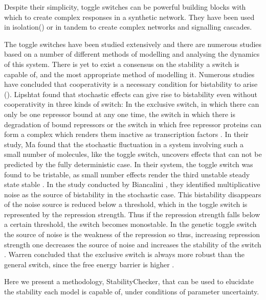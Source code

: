 Despite their simplicity, toggle switches can be powerful building blocks with which to create complex responses in a synthetic network. They have been used in isolation() or in tandem to create complex networks and signalling cascades. 

The toggle switches have been studied extensively and there are numerous studies based on a number of different methods of modelling and analysing the dynamics of this system. There is yet to exist a consensus on the stability a switch is capable of, and the most appropriate method of modelling it. Numerous studies have concluded that cooperativity is a necessary condition for bistability to arise (). Lipshtat \autocite{Lipshtat:2006wb} found that stochastic effects can give rise to bistability even without cooperativity in three kinds of switch: In the exclusive switch, in which there can only be one repressor bound at any one time, the switch in which there is degradation of bound repressors or the switch in which free repressor proteins can form a complex which renders them inactive as transcription factors \autocite{Lipshtat:2006wb}. In their study, Ma found that the stochastic fluctuation in a system involving such a small number of molecules, like the toggle switch, uncovers effects that can not be predicted by the fully deterministic case. In their system, the toggle switch was found to be tristable, as small number effects render the third unstable steady state stable \autocite{Ma:2012dt}. In the study conducted by Biancalini \autocite{Biancalani:2015vy}, they identified multiplicative noise as the source of bistability in the stochastic case. This bistability disappears of the noise source is reduced below a threshold, which in the toggle switch is represented by the repression strength. Thus if the repression strength falls below a certain threshold, the switch becomes monostable. In the genetic toggle switch the source of noise is the weakness of the repression so thus, increasing repression strength one decreases the source of noise and increases the stability of the switch \autocite{Warren:2005kea}. Warren concluded that the exclusive switch is always more robust than the general switch, since the free energy barrier is higher \autocite{Warren:2005kea}.

 Here we present a methodology, StabilityChecker, that can be used to elucidate the stability each model is capable of, under conditions of parameter uncertainty. 


